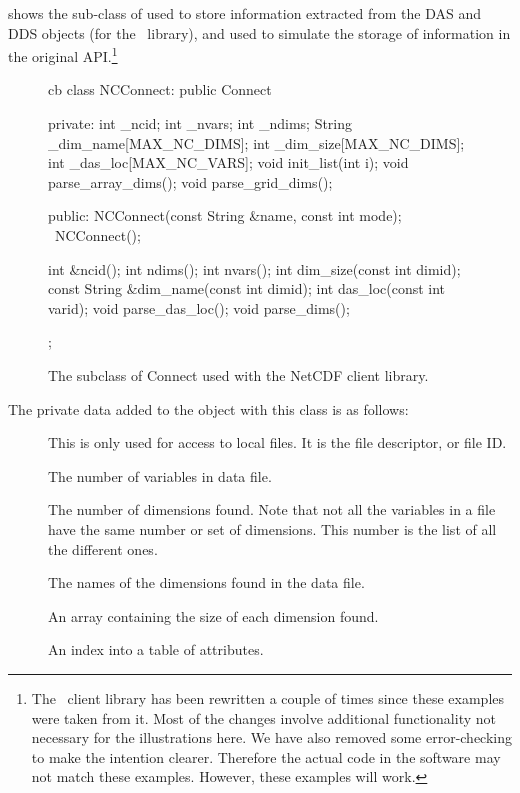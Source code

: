  shows the sub-class of  used
to store information extracted from the DAS and DDS objects (for the
\netcdf\ library), and used
to simulate the storage of information in the original
API.\footnote{The \netcdf\ client library has been rewritten a couple
  of times since these examples were taken from it.  Most of the
  changes involve additional functionality not necessary for the
  illustrations here.  We have also removed some error-checking to
  make the intention clearer.  Therefore the actual code in the
  \netcdf software may not match these examples. However, these
  examples will work.}

\begin{figure}
\begin{vcode}{cb}
class NCConnect: public Connect {
private:
    int _ncid;        
    int _nvars;       
    int _ndims;       
    String _dim_name[MAX_NC_DIMS];
    int _dim_size[MAX_NC_DIMS];
    int _das_loc[MAX_NC_VARS];
    void init_list(int i);
    void parse_array_dims();
    void parse_grid_dims();

public:
    NCConnect(const String &name, const int mode);
    ~NCConnect();

    int &ncid();
    int ndims();
    int nvars();
    int dim_size(const int dimid);
    const String &dim_name(const int dimid);
    int das_loc(const int varid);
    void parse_das_loc();
    void parse_dims();
};
\end{vcode}
\caption{The subclass of Connect used with the NetCDF client library.}
\label{fig,NCConnect}
\end{figure}

The private data added to the  object with this class
is as follows:

\begin{description}

\item[]  This is only used for access to local files.  It
  is the \netcdf file descriptor, or file ID.

\item[] The number of variables in data file.

\item[] The number of dimensions found.  Note that not
  all the variables in a \netcdf file have the same number or set of
  dimensions. This number is the list of all the different ones.

\item[] The names of the dimensions
  found in the data file.

\item[] An array containing the size
  of each dimension found.

\item[] An index into a table of
  attributes. 

\end{description}

